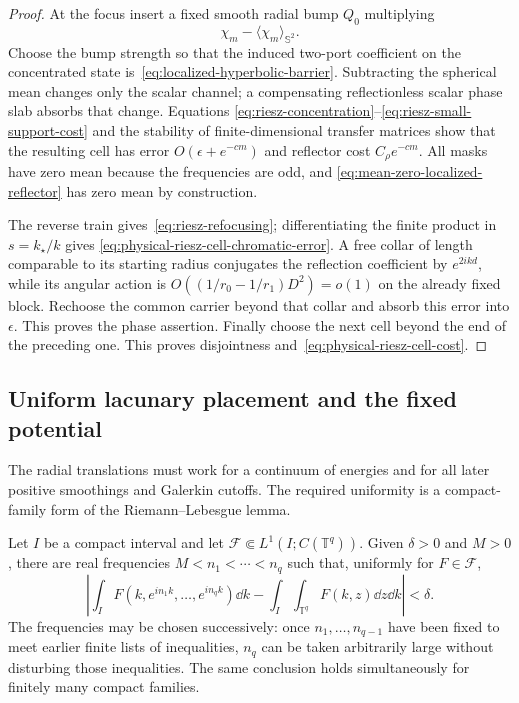 \begin{proof}
At the focus insert a fixed smooth radial bump $Q_0$ multiplying
\begin{equation}
 \chi_m-\langle\chi_m\rangle_{\mathbb S^2}.
 \label{eq:mean-zero-localized-reflector}
\end{equation}
Choose the bump strength so that the induced two-port coefficient on the
concentrated state is~\eqref{eq:localized-hyperbolic-barrier}.  Subtracting
the spherical mean changes only the scalar channel; a compensating
reflectionless scalar phase slab absorbs that change.  Equations
\eqref{eq:riesz-concentration}--\eqref{eq:riesz-small-support-cost} and the
stability of finite-dimensional transfer matrices show that the resulting
cell has error $O(\epsilon+e^{-cm})$ and reflector cost $C_\rho e^{-cm}$.
All masks have zero mean because the frequencies are odd, and
\eqref{eq:mean-zero-localized-reflector} has zero mean by construction.

The reverse train gives~\eqref{eq:riesz-refocusing}; differentiating the
finite product in $s=k_\star/k$ gives
\eqref{eq:physical-riesz-cell-chromatic-error}.  A free collar of length
comparable to its starting radius conjugates the reflection coefficient by
$e^{2ikd}$, while its angular action is
$O((1/r_0-1/r_1)D^2)=o(1)$ on the already fixed block.  Rechoose the common
carrier beyond that collar and absorb this error into $\epsilon$.  This proves
the phase assertion.  Finally choose the next cell beyond the end of the
preceding one.
This proves disjointness and~\eqref{eq:physical-riesz-cell-cost}.
\end{proof}

\subsection{Uniform lacunary placement and the fixed potential}

The radial translations must work for a continuum of energies and for all
later positive smoothings and Galerkin cutoffs.  The required uniformity is a
compact-family form of the Riemann--Lebesgue lemma.

\begin{lemma}
\label{lem:uniform-torus-placement}
Let $I$ be a compact interval and let
$\mathcal F\Subset L^1(I;C(\mathbb T^q))$.  Given $\delta>0$ and $M>0$,
there are real frequencies $M<n_1<\cdots<n_q$ such that, uniformly for
$F\in\mathcal F$,
\begin{equation}
 \left|\int_I F(k,e^{in_1k},\ldots,e^{in_qk})\dd k
 -\int_I\int_{\mathbb T^q}F(k,z)\dd z\dd k\right|<\delta.
 \label{eq:uniform-torus-placement}
\end{equation}
The frequencies may be chosen successively: once $n_1,\ldots,n_{q-1}$ have
been fixed to meet earlier finite lists of inequalities, $n_q$ can be taken
arbitrarily large without disturbing those inequalities.  The same conclusion
holds simultaneously for finitely many compact families.
\end{lemma}

